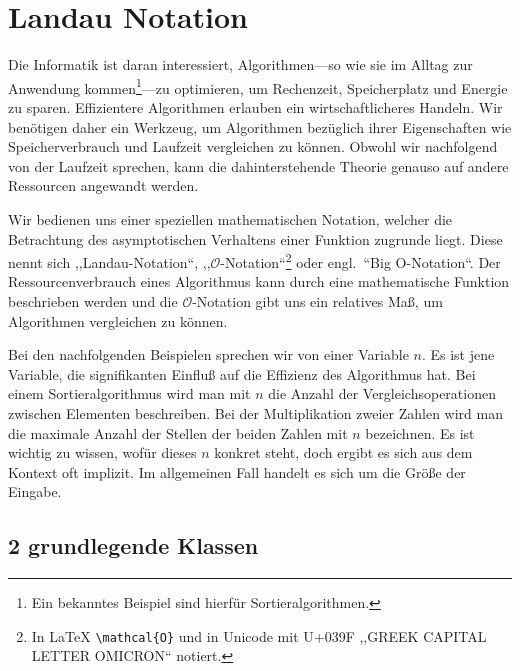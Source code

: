 \chapter{Landau Notation}
\label{sec:bigoh}
%
Die Informatik ist daran interessiert, Algorithmen---so wie sie im Alltag zur Anwendung kommen\footnote{Ein bekanntes Beispiel sind hierfür Sortieralgorithmen.}---zu optimieren, um Rechenzeit, Speicherplatz und Energie zu sparen. Effizientere Algorithmen erlauben ein wirtschaftlicheres Handeln. Wir benötigen daher ein Werkzeug, um Algorithmen bezüglich ihrer Eigenschaften wie Speicherverbrauch und Laufzeit vergleichen zu können. Obwohl wir nachfolgend von der Laufzeit sprechen, kann die dahinterstehende Theorie genauso auf andere Ressourcen angewandt werden.

Wir bedienen uns einer speziellen mathematischen Notation, welcher die Betrachtung des asymptotischen Verhaltens einer Funktion zugrunde liegt. Diese nennt sich ,,Landau-Notation``, ,,$\mathcal{O}$-Notation``\footnote{In \LaTeX{}  \texttt{\textbackslash mathcal\{O\}} und in Unicode mit U+039F ,,GREEK CAPITAL LETTER OMICRON`` notiert.} oder engl.~``Big O-Notation``. Der Ressourcenverbrauch eines Algorithmus kann durch eine mathematische Funktion beschrieben werden und die $\mathcal{O}$-Notation gibt uns ein relatives Maß, um Algorithmen vergleichen zu können.

Bei den nachfolgenden Beispielen sprechen wir von einer Variable $n$. Es ist jene Variable, die signifikanten Einfluß auf die Effizienz des Algorithmus hat. Bei einem Sortieralgorithmus wird man mit $n$ die Anzahl der Vergleichsoperationen zwischen Elementen beschreiben. Bei der Multiplikation zweier Zahlen wird man die maximale Anzahl der Stellen der beiden Zahlen mit $n$ bezeichnen. Es ist wichtig zu wissen, wofür dieses $n$ konkret steht, doch ergibt es sich aus dem Kontext oft implizit. Im allgemeinen Fall handelt es sich um die Größe der Eingabe.
%
\section{2 grundlegende Klassen}
